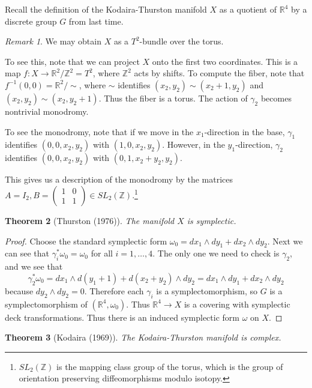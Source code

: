 \documentclass[leqno, openany]{memoir}
\newtheorem{thm}{Theorem}[chapter]
\theoremstyle{definition}
\theoremstyle{remark}
\newtheorem{rmk}[thm]{Remark}
\theoremstyle{plain}
\theoremstyle{definition}
\theoremstyle{remark}
\newcommand{\R}{\mathbb{R}}
\newcommand{\Z}{\mathbb{Z}}
\begin{document}
Recall the definition of the Kodaira-Thurston manifold $X$ as a quotient of $\R^4$ by a discrete group $G$ from last time.

\begin{rmk}
    We may obtain $X$ as a $T^2$-bundle over the torus.
\end{rmk}

To see this, note that we can project $X$ onto the first two coordinates. This is a map $f: X \to \R^2/\Z^2 = T^2$, where $\Z^2$ acts by shifts. To compute the fiber, note that $f^{-1}(0,0) = \R^2/\sim$, where $\sim$ identifies $(x_2, y_2) \sim (x_2 + 1, y_2)$ and $(x_2,y_2) \sim (x_2, y_2 + 1)$. Thus the fiber is a torus. The action of $\gamma_2$ becomes nontrivial monodromy.

To see the monodromy, note that if we move in the $x_1$-direction in the base, $\gamma_1$ identifies $(0,0,x_2,y_2)$ with $(1,0,x_2, y_2)$. However, in the $y_1$-direction, $\gamma_2$ identifies $(0,0,x_2, y_2)$ with $(0,1,x_2+y_2,y_2)$.

This gives us a description of the monodromy by the matrices $A = I_2, B = \begin{pmatrix}
    1 & 0 \\ 1 & 1
\end{pmatrix} \in SL_2(\Z)$.\footnote{$SL_2(\Z)$ is the mapping class group of the torus, which is the group of orientation preserving diffeomorphisms modulo isotopy.}

\begin{thm}[Thurston (1976)]
    The manifold $X$ is symplectic.
\end{thm}

\begin{proof}
    Choose the standard symplectic form $\omega_0 = dx_1 \wedge dy_1 + dx_2 \wedge dy_2$. Next we can see that $\gamma_i^*\omega_0 = \omega_0$ for all $i = 1, \ldots, 4$. The only one we need to check is $\gamma_2$, and we see that
    \[ \gamma_2^* \omega_0 = d x_1 \wedge d(y_1 + 1) + d(x_2 + y_2) \wedge dy_2 = dx_1 \wedge dy_1 + dx_2 \wedge dy_2 \]
    because $dy_2 \wedge dy_2 = 0$. Therefore each $\gamma_i$ is a symplectomorphism, so $G$ is a symplectomorphism of $(\R^4, \omega_0)$. Thus $\R^4 \to X$ is a covering with symplectic deck transformations. Thus there is an induced symplectic form $\omega$ on $X$.
\end{proof}

\begin{thm}[Kodaira (1969)]
    The Kodaira-Thurston manifold is complex.
\end{thm}
\end{document}
